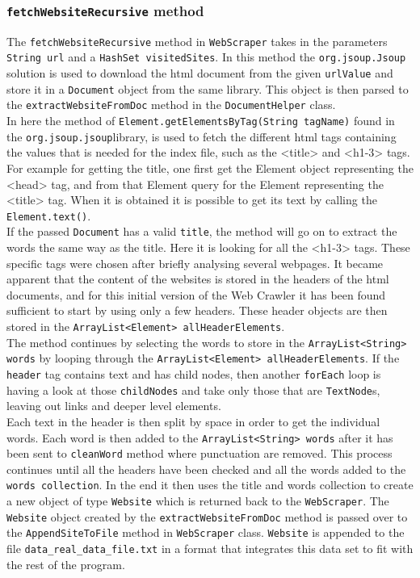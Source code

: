 \subsubsection{{\tt fetchWebsiteRecursive} method}
The {\tt fetchWebsiteRecursive} method in {\tt WebScraper} takes in the parameters {\tt String url} and a {\tt HashSet visitedSites}. In this method the {\tt org.jsoup.Jsoup} solution is used to download the html document from the given {\tt urlValue} and store it in a {\tt Document} object from the same library. This object is then parsed to the {\tt extractWebsiteFromDoc} method in the {\tt DocumentHelper} class.\\
In here the method of {\tt Element.getElementsByTag(String tagName)} found in the {\tt org.jsoup.jsoup}\footnotemark library, is used to fetch the different html tags containing the values that is needed for the index file, such as the <title> and <h1-3> tags. For example for getting the title, one first get the Element object representing the <head> tag, and from that Element query for the Element representing the <title> tag. When it is obtained it is possible to get its text by calling the {\tt Element.text()}.\\
If the passed {\tt Document} has a valid {\tt title}, the method will go on to extract the words the same way as the title. Here it is looking for all the <h1-3> tags. These specific tags were chosen after briefly analysing several webpages. It became apparent that the content of the websites is stored in the headers of the html documents, and for this initial version of the Web Crawler it has been found sufficient to start by using only a few headers. These header objects are then stored in the {\tt ArrayList<Element> allHeaderElements}.\\
The method continues by selecting the words to store in the {\tt ArrayList<String> words} by looping through the {\tt ArrayList<Element> allHeaderElements}. If the {\tt header} tag contains text and has child nodes, then another {\tt forEach} loop is having a look at those {\tt childNodes} and take only those that are {\tt TextNode}s, leaving out links and deeper level elements.\\
Each text in the header is then split by space in order to get the individual words. Each word is then added to the {\tt ArrayList<String> words} after it has been sent to {\tt cleanWord} method where punctuation are removed. This process continues until all the headers have been checked and all the words added to the {\tt words collection}. In the end it then uses the title and words collection to create a new object of type {\tt Website} which is returned back to the {\tt WebScraper}.
The {\tt Website} object created by the {\tt extractWebsiteFromDoc} method is passed over to the {\tt AppendSiteToFile} method in {\tt WebScraper} class. {\tt Website} is appended to the file {\tt data\_real\_data\_file.txt} in a format that integrates this data set to fit with the rest of the program.

